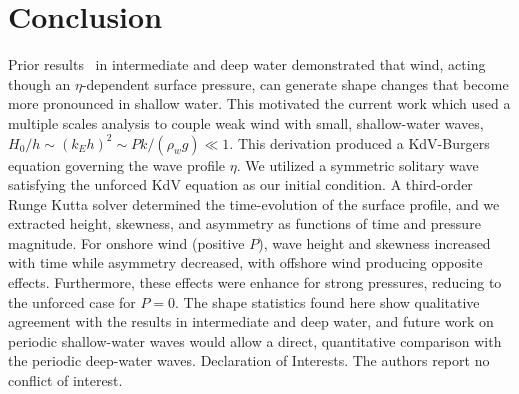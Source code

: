 \documentclass{jfm}
\begin{document}
\section{Conclusion}
Prior results~\citep{zdyrski2020wind} in intermediate and deep water
demonstrated that wind, acting though an $\eta$-dependent surface
pressure, can generate shape changes that become more pronounced in
shallow water.
This motivated the current work which used a multiple scales analysis to
couple weak wind with small, shallow-water waves, \ie{} $H_0/h \sim (k_E
h)^2 \sim P k/(\rho_w g) \ll 1$.
This derivation produced a KdV-Burgers equation governing the wave
profile $\eta$.
We utilized a symmetric solitary wave satisfying the unforced KdV
equation as our initial condition.
A third-order Runge Kutta solver determined the time-evolution of the
surface profile, and we extracted height, skewness, and asymmetry as
functions of time and pressure magnitude.
For onshore wind (positive $P$), wave height and skewness increased with
time while asymmetry decreased, with offshore wind producing opposite
effects.
Furthermore, these effects were enhance for strong pressures, reducing
to the unforced case for $P=0$.
The shape statistics found here show qualitative agreement with the
results in intermediate and deep water, and future work on periodic
shallow-water waves would allow a direct, quantitative comparison with
the periodic deep-water waves.
Declaration of Interests. The authors report no conflict of interest.

\appendix



\end{document}
